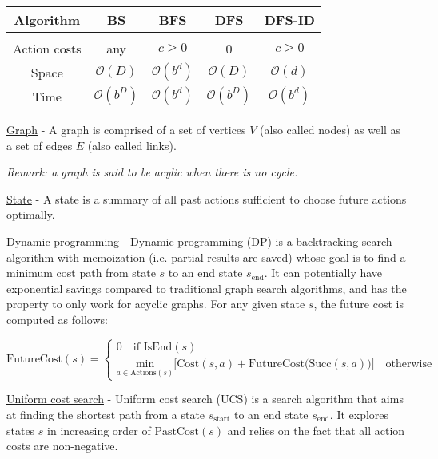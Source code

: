 \documentclass[4pt,landscape]{article}
\begin{document}
\begin{multicols*}{4}

\begin{tabular}{c | c | c | c | c} \tiny 
Algorithm & BS & BFS & DFS & DFS-ID\\
\hline\\
Action costs & any & $c\geqslant0$ & 0 & $c\ge0$\\
Space & $\mathcal{O}(D)$ & $\mathcal{O}(b^d)$ & $\mathcal{O}(D)$ & $\mathcal{O}(d)$  \\
Time & $\mathcal{O}(b^D)$ & $\mathcal{O}(b^d)$ & $\mathcal{O}(b^D)$ & $\mathcal{O}(b^d)$
\end{tabular}

{\tiny \underline{Graph} - A graph is comprised of a set of vertices $V$ (also called nodes) as well as a set of edges $E$ (also called links).}\par
{\textit{Remark: a graph is said to be acylic when there is no cycle.}}\par

{\underline{State} - A state is a summary of all past actions sufficient to choose future actions optimally.}\par

{\underline{Dynamic programming} - Dynamic programming (DP) is a backtracking search algorithm with memoization (i.e. partial results are saved) whose goal is to find a minimum cost path from state $s$ to an end state $s_\textrm{end}$. It can potentially have exponential savings compared to traditional graph search algorithms, and has the property to only work for acyclic graphs. For any given state $s$, the future cost is computed as follows:}\par

\tiny ${\textrm{FutureCost}(s)=\left\{\begin{array}{lc}0 \quad \textrm{if IsEnd}(s)\\\underset{a\in\textrm{Actions}(s)}{\textrm{min}}\big[\textrm{Cost}(s,a)+\textrm{FutureCost(Succ}(s,a))\big] \quad \textrm{otherwise}\end{array}\right.}$

{\underline{Uniform cost search} - Uniform cost search (UCS) is a search algorithm that aims at finding the shortest path from a state $s_\textrm{start}$ to an end state $s_\textrm{end}$. It explores states $s$ in increasing order of $\textrm{PastCost}(s)$ and relies on the fact that all action costs are non-negative.}\par


\end{multicols*}
\end{document}
